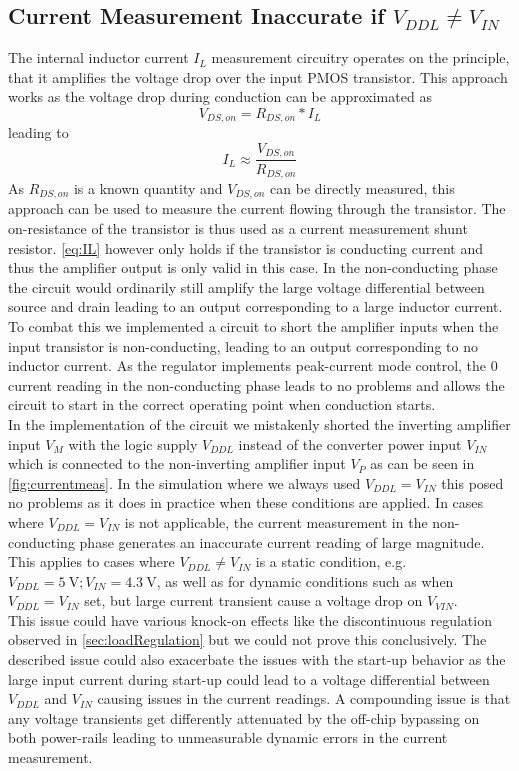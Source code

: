 \subsection{Current Measurement Inaccurate if $V_{DDL} \neq V_{IN}$}
\label{subsubsec:cur_mes_inac}
The internal inductor current $I_L$ measurement circuitry operates on the principle, that it amplifies the voltage drop over the input PMOS transistor. This approach works as the voltage drop during conduction can be approximated as 
\begin{equation}
    V_{DS,on} = R_{DS,on} * I_L
\end{equation}
\label{eq:Vds}
leading to 
\begin{equation}
    I_L \approx \frac{V_{DS,on}}{R_{DS,on}}
\end{equation}
\label{eq:IL}
As $R_{DS,on}$ is a known quantity and $V_{DS,on}$ can be directly measured, this approach can be used to measure the current flowing through the transistor.
The on-resistance of the transistor is thus used as a current measurement shunt resistor. \autoref{eq:IL} however only holds if the transistor is conducting current and thus the amplifier output is only valid in this case. In the non-conducting phase the circuit would ordinarily still amplify the large voltage differential between source and drain leading to an output corresponding to a large inductor current. To combat this we implemented a circuit to short the amplifier inputs when the input transistor is non-conducting, leading to an output corresponding to no inductor current. As the regulator implements peak-current mode control, the 0 current reading in the non-conducting phase leads to no problems and allows the circuit to start in the correct operating point when conduction starts. \\
In the implementation of the circuit we mistakenly shorted the inverting amplifier input $V_M$ with the logic supply $V_{DDL}$ instead of the converter power input $V_{IN}$ which is connected to the non-inverting amplifier input $V_P$ as can be seen in \autoref{fig:currentmeas}. In the simulation where we always used $V_{DDL} = V_{IN}$ this posed no problems as it does in practice when these conditions are applied. In cases where $V_{DDL} = V_{IN}$ is not applicable, the current measurement in the non-conducting phase generates an inaccurate current reading of large magnitude. This applies to cases where $V_{DDL} \neq V_{IN}$ is a static condition, e.g. $V_{DDL} = \qty{5}{\volt}; V_{IN}= \qty{4.3}{\volt}$, as well as for dynamic conditions such as when $V_{DDL} = V_{IN}$ set, but large current transient cause a voltage drop on $V_{VIN}$.\\
This issue could have various knock-on effects like the discontinuous regulation observed in \autoref{sec:loadRegulation} but we could not prove this conclusively. The described issue could also exacerbate the issues with the start-up behavior as the large input current during start-up could lead to a voltage differential between $V_{DDL}$ and $V_{IN}$ causing issues in the current readings. A compounding issue is that any voltage transients get differently attenuated by the off-chip bypassing on both power-rails leading to unmeasurable dynamic errors in the current measurement.

